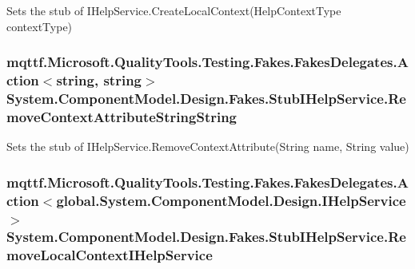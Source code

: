 Sets the stub of I\-Help\-Service.\-Create\-Local\-Context(\-Help\-Context\-Type context\-Type)

\hypertarget{class_system_1_1_component_model_1_1_design_1_1_fakes_1_1_stub_i_help_service_a9a34b0380a6d89e126b7674e3b639ba6}{
\subsubsection[{Remove\-Context\-Attribute\-String\-String}]{\setlength{\rightskip}{0pt plus 5cm}mqttf.\-Microsoft.\-Quality\-Tools.\-Testing.\-Fakes.\-Fakes\-Delegates.\-Action$<$string, string$>$ System.\-Component\-Model.\-Design.\-Fakes.\-Stub\-I\-Help\-Service.\-Remove\-Context\-Attribute\-String\-String}}\label{class_system_1_1_component_model_1_1_design_1_1_fakes_1_1_stub_i_help_service_a9a34b0380a6d89e126b7674e3b639ba6}


Sets the stub of I\-Help\-Service.\-Remove\-Context\-Attribute(\-String name, String value)

\hypertarget{class_system_1_1_component_model_1_1_design_1_1_fakes_1_1_stub_i_help_service_a35ba2de6e332947ede9f0bcb09ba812d}{
\subsubsection[{Remove\-Local\-Context\-I\-Help\-Service}]{\setlength{\rightskip}{0pt plus 5cm}mqttf.\-Microsoft.\-Quality\-Tools.\-Testing.\-Fakes.\-Fakes\-Delegates.\-Action$<$global.\-System.\-Component\-Model.\-Design.\-I\-Help\-Service$>$ System.\-Component\-Model.\-Design.\-Fakes.\-Stub\-I\-Help\-Service.\-Remove\-Local\-Context\-I\-Help\-Service}}\label{class_system_1_1_component_model_1_1_design_1_1_fakes_1_1_stub_i_help_service_a35ba2de6e332947ede9f0bcb09ba812d}


